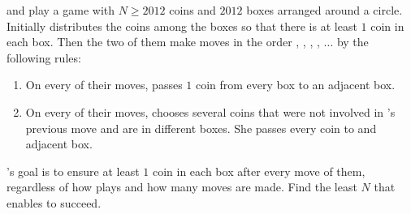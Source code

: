  and  play a game with $N \geq 2012$ coins and $2012$ boxes arranged around a circle.
Initially  distributes the coins among the boxes so that there is at least $1$ coin in each box.
Then the two of them make moves in the order , , , , $\ldots$ by the following rules:

\begin{enumerate}[label = (\alph*)]
	\item On every of their moves,  passes $1$ coin from every box to an adjacent box.
 
	\item On every of their moves,  chooses several coins that were not involved in 's previous move and are in different boxes.
		She passes every coin to and adjacent box.
\end{enumerate}

's goal is to ensure at least $1$ coin in each box after every move of them, regardless of how  plays and how many moves are made.
Find the least $N$ that enables  to succeed.

